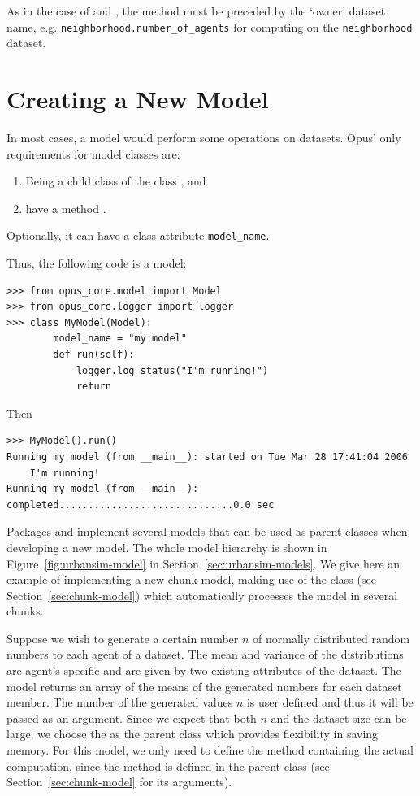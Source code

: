 As in the case of  and , the
 method must be preceded by the `owner' dataset
name, e.g. \verb|neighborhood.number_of_agents| for computing on the
\verb|neighborhood| dataset.

%
\section{Creating a New Model}
%
\label{sec:tut-creating-new-model}
In most cases, a model would perform some operations on datasets. \datasetindex Opus' only
requirements for model classes are:
\begin{enumerate}
\item Being a child class of the  class , and
\item have a method .
\end{enumerate}
Optionally, it can have a class attribute \attributesindex \verb|model_name|.

Thus, the following code is a model:
\begin{verbatim}
>>> from opus_core.model import Model
>>> from opus_core.logger import logger
>>> class MyModel(Model):
        model_name = "my model"
        def run(self):
            logger.log_status("I'm running!")
            return
\end{verbatim}
Then
\begin{verbatim}
>>> MyModel().run()
Running my model (from __main__): started on Tue Mar 28 17:41:04 2006
    I'm running!
Running my model (from __main__): completed..............................0.0 sec
\end{verbatim}

Packages  and  implement several models that can be used
as parent classes when developing a new model. The whole model hierarchy is shown in
Figure~\ref{fig:urbansim-model} in Section~\ref{sec:urbansim-models}.
We give here an example of implementing a new chunk model, making use of the 
class  (see Section~\ref{sec:chunk-model}) which automatically
processes the model in several chunks.

Suppose we wish to generate a certain number $n$ of normally distributed random numbers
to each agent of a dataset. \datasetindex The mean and variance of the distributions are agent's specific and are
given by two existing attributes \attributesindex of the dataset. \datasetindex
The model returns an array of the means of the generated numbers
for each dataset \datasetindex member. The number of the generated values $n$ is user defined \variablesindex and thus it will be
passed as an argument. Since we expect that both $n$ and the dataset \datasetindex size can be large, we choose
the  as the parent class which provides flexibility in saving memory. For this model,
we only need to define the method  containing the actual computation,
since the  method is defined
in the parent class (see Section~\ref{sec:chunk-model} for its arguments).

